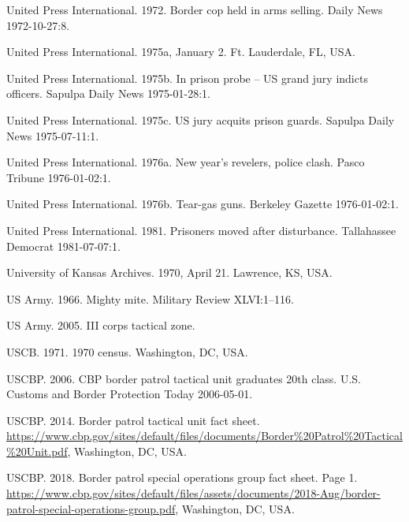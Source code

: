 \documentclass[
  11pt,
]{krantz}
\newlength{\cslhangindent}
\newlength{\cslentryspacingunit} %
\newenvironment{CSLReferences}[2] %
 {%
  \setlength{\parindent}{0pt}
  \ifodd #1
  \let\oldpar\par
  \def\par{\hangindent=\cslhangindent\oldpar}
  \fi
  \setlength{\parskip}{#2\cslentryspacingunit}
 }%
 {}
\begin{document}
\begin{CSLReferences}{1}{0}
\leavevmode{}%
United Press International. 1972. Border cop held in arms selling. Daily News 1972-10-27:8.

\leavevmode{}%
United Press International. 1975a, January 2. Ft. Lauderdale, FL, USA.

\leavevmode{}%
United Press International. 1975b. In prison probe -- US grand jury indicts officers. Sapulpa Daily News 1975-01-28:1.

\leavevmode{}%
United Press International. 1975c. US jury acquits prison guards. Sapulpa Daily News 1975-07-11:1.

\leavevmode{}%
United Press International. 1976a. New year's revelers, police clash. Pasco Tribune 1976-01-02:1.

\leavevmode{}%
United Press International. 1976b. Tear-gas guns. Berkeley Gazette 1976-01-02:1.

\leavevmode{}%
United Press International. 1981. Prisoners moved after disturbance. Tallahassee Democrat 1981-07-07:1.

\leavevmode{}%
University of Kansas Archives. 1970, April 21. Lawrence, KS, USA.

\leavevmode{}%
US Army. 1966. Mighty mite. Military Review XLVI:1--116.

\leavevmode{}%
US Army. 2005. III corps tactical zone.

\leavevmode{}%
USCB. 1971. 1970 census. Washington, DC, USA.

\leavevmode{}%
USCBP. 2006. CBP border patrol tactical unit graduates 20th class. U.S. Customs and Border Protection Today 2006-05-01.

\leavevmode{}%
USCBP. 2014. Border patrol tactical unit fact sheet. \url{https://www.cbp.gov/sites/default/files/documents/Border\%20Patrol\%20Tactical\%20Unit.pdf}, Washington, DC, USA.

\leavevmode{}%
USCBP. 2018. Border patrol special operations group fact sheet. Page 1. \url{https://www.cbp.gov/sites/default/files/assets/documents/2018-Aug/border-patrol-special-operations-group.pdf}, Washington, DC, USA.


\end{CSLReferences}
\end{document}
